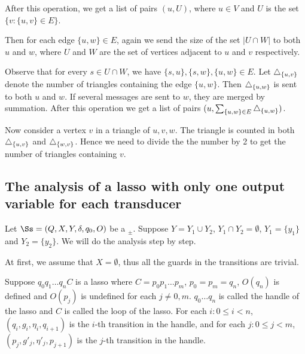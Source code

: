 {After this operation, we get a list of pairs $(u, U)$, where $u \in V$ and $U$ is the set $\{ v : \{ u, v \} \in E \}$.

Then for each edge $\{ u, w \} \in E$, again we send the size of the set $| U \cap W |$ to both $u$ and $w$, where $U$ and $W$ are
the set of vertices adjacent to $u$ and $v$ respectively. 

Observe that for every $s \in U \cap W$, we have $\{ s, u \}, \{ s, w \}, \{ u, w
\} \in E$. Let $\triangle_{\{u, v\}}$ denote the number of triangles
containing the edge $\{ u, w \}$. Then $\triangle_{\{u, w\}}$ is sent to
both $u$ and $w$. If several messages are sent to $w$, they are merged
by summation. After this operation we get a list of pairs $(u, \sum_{\{ u, w \} \in E} \triangle_{\{u, w\}})$.

Now consider a vertex $v$ in a triangle of $u, v, w$. The triangle is
counted in both $\triangle_{\{ u, v \}}$ and $\triangle_{\{ w, v \}}$. Hence
we need to divide the the number by 2 to get the number of triangles containing $v$. }


\subsection{The analysis of a lasso with only one output variable for each transducer}

Let $\Ss=(Q, X, Y, \delta, q_0, O)$ be a \SDSIT$_{\pm}$. Suppose $Y=Y_1 \cup Y_2$, $Y_1 \cap Y_2 = \emptyset$, $Y_1=\{y_1\}$ and $Y_2 = \{y_2\}$. We will do the analysis step by step.

At first, we assume that $X=\emptyset$, thus all the guards in the transitions are trivial.

Suppose $q_0 q_1 \dots q_n C$ is a lasso where $C=p_0 p_1 \dots p_m$, $p_0 = p_m=q_n$, $O(q_n)$ is defined and $O(p_j)$ is undefined for each $j \neq 0,m$. $q_0 \dots q_n$ is called the handle of the lasso and $C$ is called the loop of the lasso. For each $i: 0 \le i < n$, $(q_i, g_i, \eta_i, q_{i+1})$ is the $i$-th transition in the handle, and for each $j: 0 \le j < m$, $(p_j, g'_j, \eta'_j, p_{j+1})$ is the $j$-th transition in the handle. 

